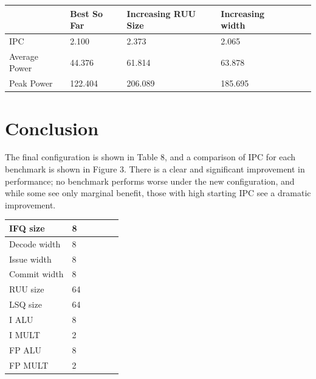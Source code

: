 \documentclass[english]{article}
\begin{document}
\begin{center}
	\vspace{.30cm}
	\begin{tabular}{ | l | l | l | l | l | l |}
		\hline
	 & Best So Far & Increasing RUU Size & Increasing width  \\ \hline
     IPC & 2.100 & 2.373 & 2.065 \\ \hline
     Average Power & 44.376 & 61.814 & 63.878 \\ \hline
     Peak Power & 122.404& 206.089 & 185.695  \\ \hline
	\end{tabular}
\end{center}

\section{Conclusion}
The final configuration is shown in Table 8, and a comparison of IPC for each benchmark is shown in Figure 3. There is a clear and significant improvement in performance; no benchmark performs worse under the new configuration, and while some see only marginal benefit, those with high starting IPC see a dramatic improvement.

\begin{center}
    \singlespacing
	\vspace{.30cm}
	\begin{tabular}{ | l | l | l | l | l | l |}
	\hline
	  IFQ size & 8 \\ \hline
      Decode width & 8 \\ \hline
      Issue width & 8 \\ \hline
      Commit width & 8 \\ \hline
      RUU size & 64 \\ \hline
      LSQ size & 64 \\ \hline
      I ALU & 8 \\ \hline
      I MULT & 2 \\ \hline
      FP ALU & 8 \\ \hline
      FP MULT & 2 \\ \hline
	\end{tabular}
\end{center}
\end{document}
